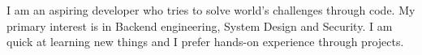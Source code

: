 \documentclass[9pt]{developercv} %
\begin{document}
\vspace{0.5cm}



\begin{minipage}[t]{0.4\textwidth} %
	\vspace{-\baselineskip} %
	
	I am an aspiring developer who tries to solve world's challenges through code.
	My primary interest is in Backend engineering, System Design and Security.
	I am quick at learning new things and I prefer hands-on experience through projects.
\end{minipage}
\hfill %
\begin{minipage}[t]{0.5\textwidth} %
	\vspace{-\baselineskip} %
	\begin{barchart}{5.5}
	\end{barchart}
\end{minipage}

\begin{center}
\end{center}


\end{document}
